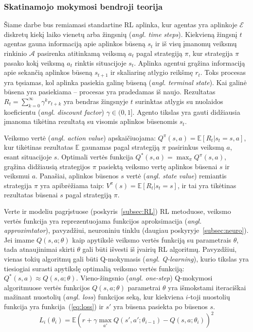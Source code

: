 \documentclass{VUMIFPSbakalaurinis}
\begin{document}
\subsubsection{Skatinamojo mokymosi bendroji teorija} \label{subsubsec:rlTeorija} 
{
	Šiame darbe bus remiamasi standartine RL aplinka, kur agentas yra aplinkoje \(\mathcal{E}\) diskretų kiekį laiko vienetų arba žingsnių (\textit{angl. time steps}). Kiekvieną žingsnį \(t\) agentas gauna informaciją apie aplinkos būseną \(s_t\) ir iš visų įmanomų veiksmų rinkinio \(\mathcal{A}\) pasirenka atitinkamą veiksmą \(a_t\) pagal strategiją \(\pi\), kur strategija \(\pi\) pasako kokį veiksmą \(a_t\) rinktis situacijoje \(s_t\). Aplinka agentui grąžina informaciją apie sekančią aplinkos būseną \(s_{t+1}\) ir skaliarinę atlygio reikšmę \(r_t\). Toks procesas yra tęsiamas, kol aplinka pasiekia galinę būseną (\textit{angl. terminal state}). Kai galinė būsena yra pasiekiama -- procesas yra pradedamas iš naujo. Rezultatas \(R_t = \sum_{k=0}^{\infty} \gamma^k r_{t+k}\) yra bendras žingsnyje \(t\) surinktas atlygis su nuolaidos koeficientu (\textit{angl. discount factor}) \(\gamma \in (0, 1] \). Agento tikslas yra gauti didžiausia įmanoma tikėtina rezultatą su visomis aplinkos būsenomis \(s_t\).\par
	
	Veiksmo vertė (\textit{angl. action value}) apskaičiuojama: \(Q^{\pi}(s, a) = \mathbb{E}[R_t|s_t = s, a] \), kur tikėtinas rezultatas \(\mathbb{E}\) gaunamas pagal strategiją \(\pi\) pasirinkus veiksmą \(a\), esant situacijoje \(s\). Optimali vertės funkcija \(Q^*(s, a) = \max_{\pi}Q^{\pi}(s, a)\), grąžina didžiausią strategijos \(\pi\) pasiektą veiksmo vertę aplinkos būsenai \(s\) ir veiksmui \(a\). Panašiai, aplinkos būsenos \(s\) vertė (\textit{angl. state value}) remiantis strategija \(\pi\) yra apibrėžiama taip: \(V^{\pi}(s) = \mathbb{E}[R_t|s_t = s] \), ir tai yra tikėtinas rezultatas būsenai \(s\) pagal strategiją \(\pi\).\par
	
	Verte ir modeliu pagrįstuose (poskyris~\ref{subsec:RL}) RL metoduose, veiksmo vertės funkcija yra reprezentuojama funkcijos aproksimacija (\textit{angl. approximtator}), pavyzdžiui, neuroniniu tinklu (daugiau poskyryje~\ref{subsec:neuro}). Jei imame \(Q(s, a; \theta)\) kaip apytikslė veiksmo vertės funkciją su parametrais \(\theta\), tada atnaujinimai skirti \(\theta\) gali būti išvesti iš įvairių RL algoritmų. Pavyzdžiui, vienas tokių algoritmų gali būti Q-mokymasis (\textit{angl. Q-learning}), kurio tikslas yra tiesiogiai surasti apytikslę optimalią veiksmo vertės funkciją: \(Q^*(s, a) \approx Q(s, a; \theta)\). Vieno-žingsnio (\textit{angl. one-step}) Q-mokymosi algoritmuose vertės funkcijos \(Q(s, a; \theta)\) parametrai \(\theta\) yra išmokstami iteraciškai mažinant nuostolių (\textit{angl. loss}) funkcijos seką, kur kiekviena \(i\)-toji nuostolių funkcija yra funkcija~(\ref{eq:loss}) ir \(s'\) yra būsena pasiekta po būsenos \(s\).
	\begin{equation}\label{eq:loss}
		L_i(\theta_i) = \mathbb{E} \left( r + \gamma \max_{a'} Q(s', a'; \theta_{i-1}) - Q(s, a; \theta_i) \right)^2
	\end{equation}
	
}
\end{document}
